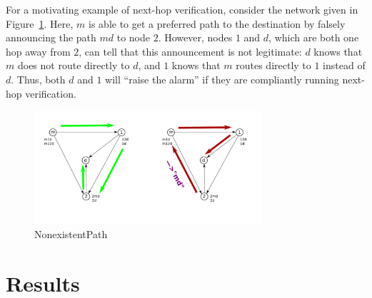 \documentclass[10pt]{article}
\newtheorem{lemma}{Lemma}
\begin{document}
  For a motivating example of next-hop verification, consider the
  network given in Figure~\ref{fig:Nonexistent}.
  Here, $m$ is able to get a preferred path to the destination by falsely
  announcing the path $md$ to node $2$.
  However, nodes $1$ and $d$, which are both one hop away from $2$,
  can tell that this announcement is not legitimate:
  $d$ knows that $m$ does not route directly to $d$,
  and $1$ knows that $m$ routes directly to $1$ instead of $d$.
  Thus, both $d$ and $1$ will ``raise the alarm'' if they are compliantly
  running next-hop verification.
  \begin{figure}[h]
    \centering
    \caption{NonexistentPath}\label{fig:Nonexistent}
    \includegraphics[width=0.75\textwidth]{NonexistentBetter}
  \end{figure}

\section{Results}

\end{document}
